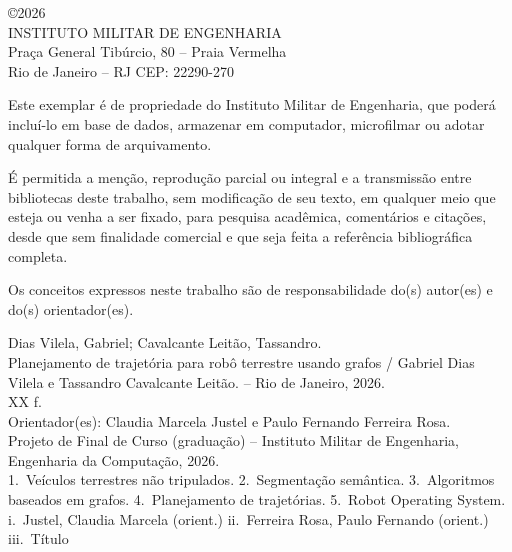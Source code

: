 \documentclass[
    12pt,
    openright,
    oneside,
    a4paper,
    english,
    brazil
]{abntex2}
\begin{document}
\begin{fichacatalografica}
    \vspace*{\fill}
    \begin{center}
    {\normalsize \copyright 2026\\
    INSTITUTO MILITAR DE ENGENHARIA\\
    Praça General Tibúrcio, 80 -- Praia Vermelha\\
    Rio de Janeiro -- RJ CEP: 22290-270}
    \end{center}

    \vspace{1cm}

    \noindent Este exemplar é de propriedade do Instituto Militar de Engenharia, que poderá incluí-lo em base de dados, armazenar em computador, microfilmar ou adotar qualquer forma de arquivamento.

    É permitida a menção, reprodução parcial ou integral e a transmissão entre bibliotecas deste trabalho, sem modificação de seu texto, em qualquer meio que esteja ou venha a ser fixado, para pesquisa acadêmica, comentários e citações, desde que sem finalidade comercial e que seja feita a referência bibliográfica completa.

    Os conceitos expressos neste trabalho são de responsabilidade do(s) autor(es) e do(s) orientador(es).

    \vspace{1cm}

    \noindent
    Dias Vilela, Gabriel; Cavalcante Leitão, Tassandro.\\
    Planejamento de trajetória para robô terrestre usando grafos / Gabriel Dias Vilela e Tassandro Cavalcante Leitão. -- Rio de Janeiro, 2026.\\
    XX f.\\[0.5em]
    Orientador(es): Claudia Marcela Justel e Paulo Fernando Ferreira Rosa.\\[0.5em]
    Projeto de Final de Curso (graduação) -- Instituto Militar de Engenharia, Engenharia da Computação, 2026.\\[0.5em]
    1.~Veículos terrestres não tripulados. 2.~Segmentação semântica. 3.~Algoritmos baseados em grafos. 4.~Planejamento de trajetórias. 5.~Robot Operating System. i.~Justel, Claudia Marcela (orient.) ii.~Ferreira Rosa, Paulo Fernando (orient.) iii.~Título
    \vspace*{\fill}
\end{fichacatalografica}
\end{document}
